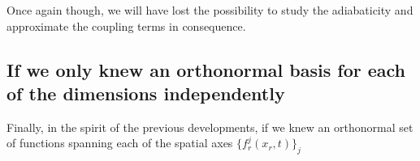 \documentclass[11pt, a4paper]{article} %
\begin{document}
Once again though, we will have lost the possibility to study the adiabaticity and approximate the coupling terms in consequence.

\subsection{If we only knew an orthonormal basis for each of the dimensions independently}
Finally, in the spirit of the previous developments, if we knew an orthonormal set of functions spanning each of the spatial axes $\{ f^j_r(x_r,t) \}_j$













 


\end{document}
